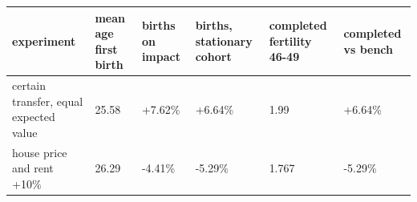 \begingroup\small
\setlength{\tabcolsep}{3pt}
\renewcommand{\arraystretch}{1.04}
\begin{tabularx}{\linewidth}{XXXXXX}
\toprule
experiment & mean age first birth & births on impact & births, stationary cohort & completed fertility 46-49 & completed vs bench \\
\midrule
certain transfer, equal expected value & 25.58 & +7.62\% & +6.64\% & 1.99 & +6.64\% \\
house price and rent +10\% & 26.29 & -4.41\% & -5.29\% & 1.767 & -5.29\% \\
\bottomrule
\end{tabularx}
\endgroup
